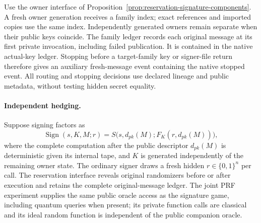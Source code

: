 \documentclass[pdflatex]{sn-jnl}
\theoremstyle{thmstyleone}
\theoremstyle{thmstylethree}
\theoremstyle{thmstyletwo}
\begin{document}
Use the owner interface of
Proposition~\ref{prop:reservation-signature-components}. A fresh owner
generation receives a family index; exact references and imported copies
use the same index. Independently generated owners remain separate when
their public keys coincide. The family ledger records each original
message at its first private invocation, including failed publication.
It is contained in the native actual-key ledger. Stopping before a
target-family key or signer-file return therefore gives an auxiliary
fresh-message event containing the native stopped event. All routing and
stopping decisions use declared lineage and public metadata, without
testing hidden secret equality.

\paragraph{Independent hedging.}
Suppose signing factors as
\[
 \operatorname{Sign}(s,K,M;r)
 =S\bigl(s,d_{pk}(M);F_K(r,d_{pk}(M))\bigr),
\]
where the complete computation after the public descriptor $d_{pk}(M)$
is deterministic given its internal tape, and $K$ is generated
independently of the remaining owner state. The ordinary signer draws a
fresh hidden $r\in\{0,1\}^n$ per call. The reservation interface reveals
original randomizers before or after execution and retains the complete
original-message ledger. The joint PRF experiment supplies the same public
oracle access as the signature game, including quantum queries when
present; its private function calls are classical and its ideal random
function is independent of the public companion oracle.
\end{document}
